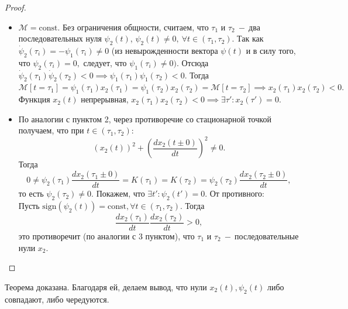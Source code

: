 \documentclass{article}
\begin{document}
\begin{proof}
\begin{itemize}
    \item[3.] $\mathcal{M} = \text{const}.$ Без ограничения общности, считаем, что $\tau_1$ и $\tau_2~-~$два последовательных нуля $\psi_2(t)$, $\psi_2(t) \neq 0, ~\forall t\in(\tau_1, \tau_2).$ Так как $\dot{\psi}_2(\tau_i)=-\psi_1(\tau_i) \neq 0$ (из невырожденности вектора $\psi(t)$ и в силу того, что $\psi_2(\tau_i) = 0,$ следует, что $\psi_1(\tau_i)\neq0).$ Отсюда $\dot{\psi}_2(\tau_1)\dot{\psi}_2(\tau_2) < 0 \implies \psi_1(\tau_1)\psi_1(\tau_2) < 0.$ Тогда $\mathcal{M}[t = \tau_1] = \psi_1(\tau_1)x_2(\tau_1) = \psi_1(\tau_2)x_2(\tau_2) = \mathcal{M}[t = \tau_2] \implies x_2(\tau_1)x_2(\tau_2) < 0. $ Функция $x_2(t)$ непрерывная, $x_2(\tau_1)x_2(\tau_2) < 0 \implies \exists\tau': x_2(\tau') = 0.$
    \item[4.] По аналогии с пунктом 2, через противоречие со стационарной точкой получаем, что при $t\in(\tau_1, \tau_2):$
    $$(x_2(t))^2 + \left(\dfrac{dx_2(t\pm0)}{dt}\right)^2 \neq 0.$$
    Тогда
    $$0 \neq \psi_2(\tau_1) \dfrac{dx_2(\tau_1\pm0)}{dt} = K(\tau_1)=K(\tau_2) = \psi_2(\tau_2)\dfrac{dx_2(\tau_2\pm0)}{dt},$$
    то есть $\psi_2(\tau_2)\neq 0.$ Покажем, что $\exists t': \psi_2(t') = 0.$ 
    От противного:\\
    Пусть $\text{sign}(\psi_2(t))=\text{const}, \forall t \in(\tau_1,\tau_2).$ Тогда
    $$\dfrac{dx_2(\tau_1)}{dt}\dfrac{dx_2(\tau_2)}{dt}>0,$$
    это противоречит (по аналогии с 3 пунктом), что $\tau_1$ и $\tau_2~-~$последовательные нули $x_2.$
 \end{itemize}
 \end{proof}
Теорема доказана. Благодаря ей, делаем вывод, что нули $x_2(t), \psi_2(t)$ либо совпадают, либо чередуются.
\newpage
\end{document}
